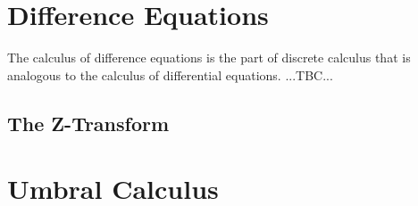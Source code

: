 




\section{Difference Equations}
The calculus of difference equations is the part of discrete calculus that is analogous to the calculus of differential equations. ...TBC...


\subsection{The Z-Transform}



\section{Umbral Calculus}




\begin{comment}


Why don't they teach Newton's calculus of 'What comes next?'
https://www.youtube.com/watch?v=4AuV93LOPcE

Differenzenrechnung: Vom Kalkül der diskreten Analysis
https://www.youtube.com/watch?v=1-Q7Z-F4KVs

Another World Similar to Calculus | Discrete Calculus
https://www.youtube.com/watch?v=mVjBSWHlTnY







\end{comment}
